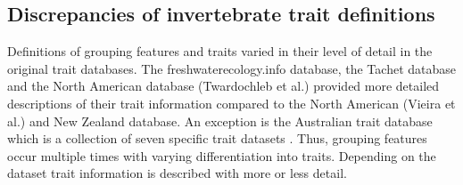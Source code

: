 \documentclass[../Draft_harmonization_paper.tex]{subfiles}
\begin{document}

\subsection*{Discrepancies of invertebrate trait definitions}

Definitions of grouping features and traits varied in their level of detail in the original trait databases. The freshwaterecology.info database, the Tachet database and the North American database (Twardochleb et al.) provided more detailed descriptions of their trait information compared to the North American (Vieira et al.) and New Zealand database. An exception is the Australian trait database which is a collection of seven specific trait datasets \cite{kefford_integrated_2020}. Thus, grouping features occur multiple times with varying differentiation into traits. Depending on the dataset trait information is described with more or less detail.
\end{document}
